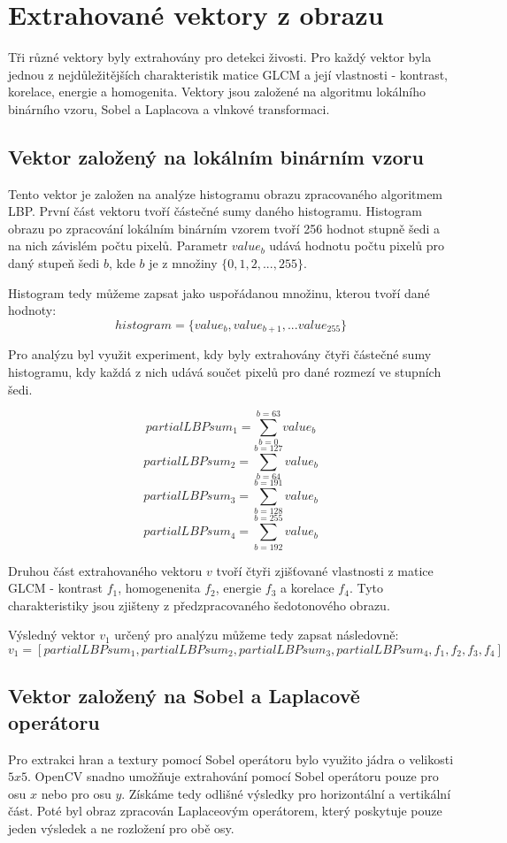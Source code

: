 \section{Extrahované vektory z obrazu}
Tři různé vektory byly extrahovány pro detekci živosti. Pro každý vektor byla jednou z nejdůležitějších charakteristik matice GLCM a její vlastnosti - kontrast, korelace, energie a homogenita. Vektory jsou založené na algoritmu lokálního binárního vzoru, Sobel a Laplacova a vlnkové transformaci.

\subsection{Vektor založený na lokálním binárním vzoru}
Tento vektor je založen na analýze histogramu obrazu zpracovaného algoritmem LBP. První část vektoru tvoří částečné sumy daného histogramu. Histogram obrazu po zpracování lokálním binárním vzorem tvoří 256 hodnot stupně šedi a na nich závislém počtu pixelů. Parametr $value_b$ udává hodnotu počtu pixelů pro daný stupeň šedi $b$, kde $b$ je z množiny $\{0,1,2,...,255\}$.

Histogram tedy můžeme zapsat jako uspořádanou množinu, kterou tvoří dané hodnoty:
$$histogram = \{value_b, value_{b+1}, ... value_{255}\}$$

Pro analýzu byl využit experiment, kdy byly extrahovány čtyři částečné sumy histogramu, kdy každá z nich udává součet pixelů pro dané rozmezí ve stupních šedi.

$$partialLBPsum_1 = \sum_{b=0}^{b=63} value_b $$
$$partialLBPsum_2 = \sum_{b=64}^{b=127} value_b $$
$$partialLBPsum_3 = \sum_{b=128}^{b=191} value_b $$
$$partialLBPsum_4 = \sum_{b=192}^{b=255} value_b $$

Druhou část extrahovaného vektoru $v$ tvoří čtyři zjišťované vlastnosti z matice GLCM - kontrast $f_1$, homogenenita $f_2$, energie $f_3$ a korelace $f_4$. Tyto charakteristiky jsou zjišteny z předzpracovaného šedotonového obrazu.

Výsledný vektor $v_1$ určený pro analýzu můžeme tedy zapsat následovně:
$$v_1 = [partialLBPsum_1, partialLBPsum_2, partialLBPsum_3, partialLBPsum_4, f_1, f_2, f_3, f_4]$$

\subsection{Vektor založený na Sobel a Laplacově operátoru}
Pro extrakci hran a textury pomocí Sobel operátoru bylo využito jádra o velikosti $5x5$. OpenCV snadno umožňuje extrahování pomocí Sobel operátoru pouze pro osu $x$ nebo pro osu $y$. Získáme tedy odlišné výsledky pro horizontální a vertikální část. Poté byl obraz zpracován Laplaceovým operátorem, který poskytuje pouze jeden výsledek a ne rozložení pro obě osy. 

